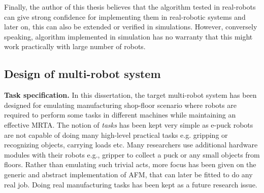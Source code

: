 Finally, the author of this thesis believes that the algorithm tested in real-robots can give strong confidence for implementing them in real-robotic systems and later on, this can also be extended or verified in simulations. However, conversely speaking, algorithm implemented in simulation has no warranty that this might work practically with large number of robots.
\subsection{Design of multi-robot system}
\label{expt-tools:mrs-design}
\textbf{Task specification.} In this dissertation, the target multi-robot system has been designed for emulating manufacturing shop-floor scenario where robots are required to perform some tasks in different machines while maintaining an effective MRTA. The notion of {\em tasks} has been kept very simple as e-puck robots are not capable of doing many high-level practical tasks e.g. gripping or recognizing objects, carrying loads etc. Many researchers use additional hardware modules with their robots e.g., gripper to collect a puck or any small objects from floors. Rather than emulating such trivial acts, more focus has been given on the generic and abstract implementation of AFM, that can later be fitted to do any real job. Doing real manufacturing tasks has been kept as a future research issue.

